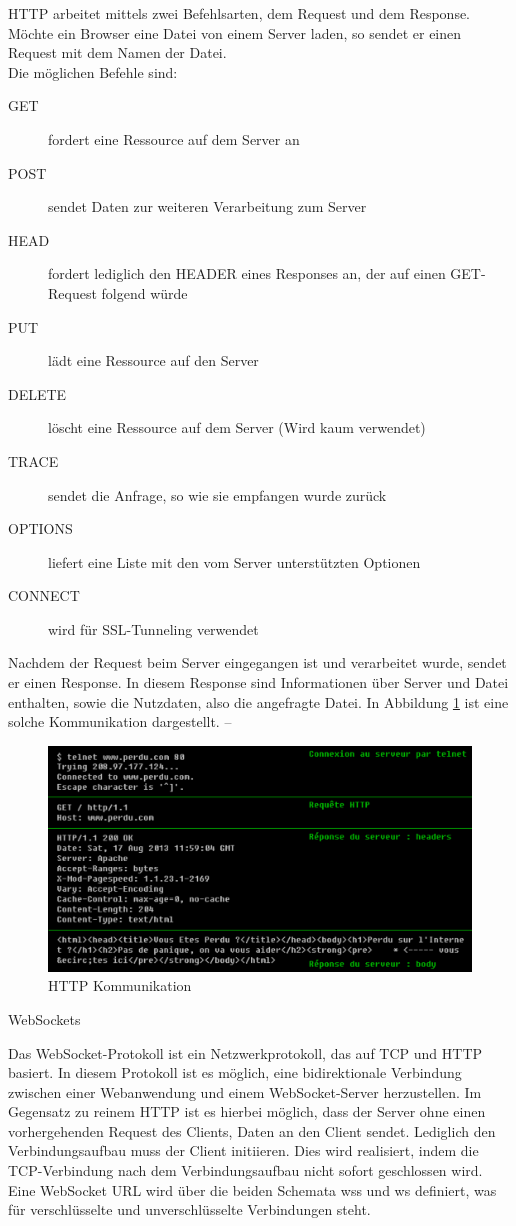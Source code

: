 HTTP arbeitet mittels zwei Befehlsarten, dem Request und dem Response. Möchte ein Browser eine Datei von einem Server laden, so sendet er einen Request mit dem Namen der Datei. \\
Die möglichen Befehle sind: 
\begin{description}
	\item[GET] fordert eine Ressource auf dem Server an
	\item[POST] sendet Daten zur weiteren Verarbeitung zum Server
	\item[HEAD] fordert lediglich den HEADER eines Responses an, der auf einen GET-Request folgend würde
	\item[PUT] lädt eine Ressource auf den Server
	\item[DELETE] löscht eine Ressource auf dem Server (Wird kaum verwendet)
	\item[TRACE] sendet die Anfrage, so wie sie empfangen wurde zurück
	\item[OPTIONS] liefert eine Liste mit den vom Server unterstützten Optionen
	\item[CONNECT] wird für SSL-Tunneling verwendet
\end{description} Nachdem der Request beim Server eingegangen ist und verarbeitet wurde, sendet er einen Response. In diesem Response sind Informationen über Server und Datei enthalten, sowie die Nutzdaten, also die angefragte Datei. In Abbildung \ref{fig:http_request_response} ist eine solche Kommunikation dargestellt.
-- 
\begin{figure}
	\includegraphics[width=\textwidth]{images/http_request_response.pdf}
	\caption{HTTP Kommunikation}
	\label{fig:http_request_response}
\end{figure}



WebSockets

Das WebSocket-Protokoll ist ein Netzwerkprotokoll, das auf TCP und HTTP basiert. In diesem Protokoll ist es möglich, eine bidirektionale Verbindung zwischen einer Webanwendung und einem WebSocket-Server herzustellen. Im Gegensatz zu reinem HTTP ist es hierbei möglich, dass der Server ohne einen vorhergehenden Request des Clients, Daten an den Client sendet. Lediglich den Verbindungsaufbau muss der Client initiieren. Dies wird realisiert, indem die TCP-Verbindung nach dem Verbindungsaufbau nicht sofort geschlossen wird. 
Eine WebSocket URL wird über die beiden Schemata wss und ws definiert, was für verschlüsselte und unverschlüsselte Verbindungen steht.

